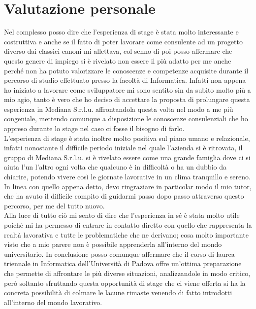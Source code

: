 \section{Valutazione personale}
Nel complesso posso dire che l'esperienza di stage è stata molto interessante e costruttiva e anche se il fatto di poter lavorare come consulente ad un progetto diverso dai classici canoni mi allettava, col senno di poi posso affermare che questo genere di impiego si è rivelato non essere il più adatto per me anche perché non ha potuto valorizzare le conoscenze e competenze acquisite durante il percorso di studio effettuato presso la facoltà di Informatica. Infatti non appena ho iniziato a lavorare come sviluppatore mi sono sentito sin da subito molto più a mio agio, tanto è vero che ho deciso di accettare la proposta di prolungare questa esperienza in Mediana S.r.l.u. affrontandola questa volta nel modo a me più congeniale, mettendo comunque a disposizione le conoscenze consulenziali che ho appreso durante lo stage nel caso ci fosse il bisogno di farlo.\\
L'esperienza di stage è stata inoltre molto positiva sul piano umano e relazionale, infatti nonostante il difficile periodo iniziale nel quale l'azienda si è ritrovata, il gruppo di Mediana S.r.l.u. si è rivelato essere come una grande famiglia dove ci si aiuta l'un l'altro ogni volta che qualcuno è in difficoltà o ha un dubbio da chiarire, potendo vivere così le giornate lavorative in un clima tranquillo e sereno. In linea con quello appena detto, devo ringraziare in particolar modo il mio tutor, che ha avuto il difficile compito di guidarmi passo dopo passo attraverso questo percorso, per me del tutto nuovo. \\
Alla luce di tutto ciò mi sento di dire che l'esperienza in sé è stata molto utile poiché mi ha permesso di entrare in contatto diretto con quello che rappresenta la realtà lavorativa e tutte le problematiche che ne derivano; cosa molto importante visto che a mio parere non è possibile apprenderla all'interno del mondo universitario. \newpage
In conclusione posso comunque affermare che il corso di laurea triennale in Informatica dell'Università di Padova offre un'ottima preparazione che permette di affrontare le più diverse situazioni, analizzandole in modo critico, però soltanto sfruttando questa opportunità di stage che ci viene offerta si ha la concreta possibilità di colmare le lacune rimaste venendo di fatto introdotti all'interno del mondo lavorativo.
